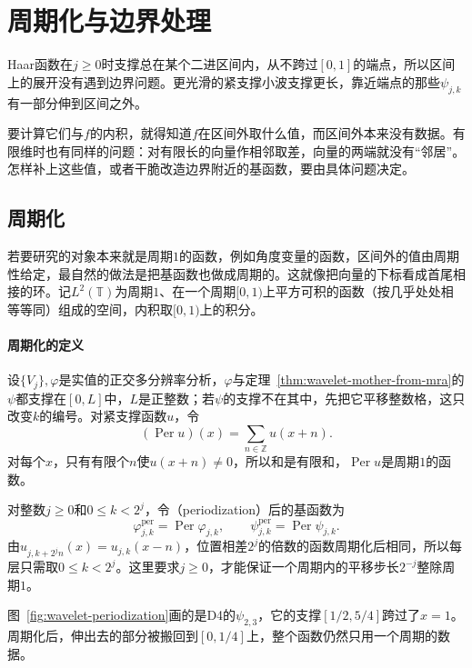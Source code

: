 \section{周期化与边界处理}
\label{sec:wavelet-boundary}

Haar函数在$j\geq0$时支撑总在某个二进区间内，从不跨过$[0,1]$的端点，所以区间上的展开没有遇到边界问题。更光滑的紧支撑小波支撑更长，靠近端点的那些$\psi_{j,k}$有一部分伸到区间之外。

要计算它们与$f$的内积，就得知道$f$在区间外取什么值，而区间外本来没有数据。有限维时也有同样的问题：对有限长的向量作相邻取差，向量的两端就没有“邻居”。怎样补上这些值，或者干脆改造边界附近的基函数，要由具体问题决定。

\subsection{周期化}
\label{sec:wavelet-periodization}

若要研究的对象本来就是周期$1$的函数，例如角度变量的函数，区间外的值由周期性给定，最自然的做法是把基函数也做成周期的。这就像把向量的下标看成首尾相接的环。记$L^2(\mathbb T)$为周期$1$、在一个周期$[0,1)$上平方可积的函数（按几乎处处相等等同）组成的空间，内积取$[0,1)$上的积分。

\paragraph{周期化的定义}
设$\{V_j\},\varphi$是实值的正交多分辨率分析，$\varphi$与定理~\ref{thm:wavelet-mother-from-mra}的$\psi$都支撑在$[0,L]$中，$L$是正整数；若$\psi$的支撑不在其中，先把它平移整数格，这只改变$k$的编号。对紧支撑函数$u$，令
\begin{equation}
 (\operatorname{Per}u)(x)=\sum_{n\in\mathbb Z}u(x+n).
 \label{eq:wavelet-per}
\end{equation}
对每个$x$，只有有限个$n$使$u(x+n)\neq0$，所以和是有限和，$\operatorname{Per}u$是周期$1$的函数。

对整数$j\geq0$和$0\leq k<2^j$，令（periodization）后的基函数为
\begin{equation}
 \varphi^{\mathrm{per}}_{j,k}=\operatorname{Per}\varphi_{j,k},\qquad
 \psi^{\mathrm{per}}_{j,k}=\operatorname{Per}\psi_{j,k}.
 \label{eq:wavelet-periodized-basis}
\end{equation}
由$u_{j,k+2^jn}(x)=u_{j,k}(x-n)$，位置相差$2^j$的倍数的函数周期化后相同，所以每层只需取$0\leq k<2^j$。这里要求$j\geq0$，才能保证一个周期内的平移步长$2^{-j}$整除周期$1$。

图~\ref{fig:wavelet-periodization}画的是D4的$\psi_{2,3}$，它的支撑$[1/2,5/4]$跨过了$x=1$。周期化后，伸出去的部分被搬回到$[0,1/4]$上，整个函数仍然只用一个周期的数据。

